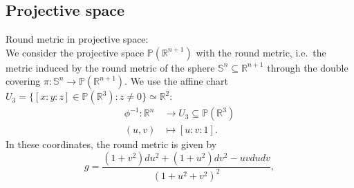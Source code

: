 \documentclass{report}
\begin{document}
\subsection{Projective space} 
Round metric in projective space:\\
    We consider the projective space $\mathbb P(\mathbb R^{n+1})$ with the round metric, i.e.\ the metric induced by the round metric of the sphere $\mathbb S^n \subseteq \mathbb R^{n+1}$ through the double covering $\pi: \mathbb S^n \to \mathbb P(\mathbb R^{n+1})$.
    We use the affine chart $U_3 = \{[x:y:z] \in \mathbb P(\mathbb R^3): z \neq 0\} \simeq \mathbb R^2$:
    \begin{align*}
        \phi^{-1}: \mathbb R^n &\to U_3 \subseteq \mathbb P(\mathbb R^3)\\
        (u,v) &\mapsto [u:v:1].
    \end{align*}
    In these coordinates, the round metric is given by
    \[
    g = \frac{(1 + v^2) du^2 + (1 + u^2) dv^2 - uv du dv}{(1 + u^2 + v^2)^2},
    \]
\end{document}
